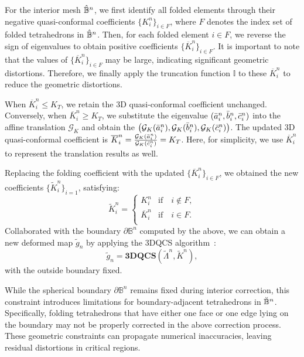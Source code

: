 \documentclass{article}
\begin{document}
For the interior mesh $\Hat{\mathbb{B}}^n$, we first identify all folded elements through their negative quasi-conformal coefficients $\{K^n_i\}_{i\in F}$, where $F$ denotes the index set of folded tetrahedrons in $\Hat{\mathbb{B}}^n$. Then, for each folded element $i\in F$, we reverse the sign of eigenvalues to obtain positive coefficients $\{\overline{K}^n_i\}_{i\in F}$. It is important to note that the values of $\{\overline{K}^n_i\}_{i\in F}$ may be large, indicating significant geometric distortions. Therefore, we finally apply the truncation function $\mathbb{I}$ to these $\overline{K}^n_i$ to reduce the geometric distortions.  

When $\overline{K}^n_i \leq K_T$, we retain the 3D quasi-conformal coefficient unchanged. Conversely, when $\overline{K}^n_i \geq K_T$, we substitute the eigenvalue $(\Bar{a}^n_i,\Bar{b}^n_i,\Bar{c}^n_i)$ into the affine translation $\mathcal{G}_K$ and obtain the $\left( \mathcal{G}_K(\Bar{a}^n_i), \mathcal{G}_K(\Bar{b}^n_i), \mathcal{G}_K(\Bar{c}^n_i) \right)$. The updated 3D quasi-conformal coefficient is $\overline{K}^n_i = \frac{\mathcal{G}_K(\Bar{a}^n_i)}{\mathcal{G}_K(\Bar{c}^n_i)} = K_T$. Here, for simplicity, we use $\overline{K}^n_i$ to represent the translation results as well.

Replacing the folding coefficient with the updated $\{\overline{K}^n_i\}_{i\in F}$, we obtained the new coefficients $\{\widetilde{K}^n_i \}_{i = 1}$, satisfying:
\begin{equation}
            \widetilde{K}^n_i = 
      \left \{
    \begin{array}{ll}
     K^n_i    & \text{if} \quad i \notin F, \\
     \overline{K}^n_i  &  \text{if} \quad i \in F. \\
    \end{array}  
    \right.
\end{equation}
Collaborated with the boundary $\partial \mathbb{B}^n$ computed by the above, we can obtain a new deformed map $\widetilde{g}_n$ by applying the 3DQCS algorithm~\cite{chen2024novel3dmappingrepresentation}:
\begin{equation}
    \widetilde{g}_n = \textbf{3DQCS}(\widetilde{\Lambda}^n, \widetilde{K}^n),
\end{equation}
with the outside boundary fixed. 

While the spherical boundary $\partial\mathbb{B}^n$ remains fixed during interior correction, this constraint introduces limitations for boundary-adjacent tetrahedrons in $\Breve{\mathbb{B}}^n$. Specifically, folding tetrahedrons that have either one face or one edge lying on the boundary may not be properly corrected in the above correction process. These geometric constraints can propagate numerical inaccuracies, leaving residual distortions in critical regions.
\end{document}

